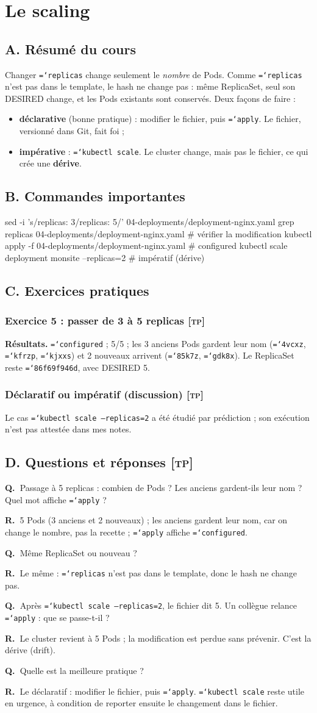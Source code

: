 \documentclass[11pt,a4paper]{article}
\newcommand{\cmd}[1]{\texttt{\hyphenchar\font=`\-#1}}
\newcommand{\tp}{\textsc{[tp]}}
\newcommand{\QR}[2]{\needspace{4\baselineskip}\par\noindent\textbf{Q.~}#1\par\nopagebreak\noindent\textbf{R.~}#2\par\medskip}
\newcommand{\partie}[1]{\needspace{9\baselineskip}\subsection*{#1}}
\newcommand{\exo}[1]{\needspace{8\baselineskip}\subsubsection*{#1}}
\begin{document}
\section{Le scaling}

\partie{A. Résumé du cours}
Changer \cmd{replicas} change seulement le \emph{nombre} de Pods. Comme \cmd{replicas} n'est pas dans le template, le hash ne change pas : même ReplicaSet, seul son DESIRED change, et les Pods existants sont conservés.
Deux façons de faire :
\begin{itemize}
  \item \textbf{déclarative} (bonne pratique) : modifier le fichier, puis \cmd{apply}. Le fichier, versionné dans Git, fait foi ;
  \item \textbf{impérative} : \cmd{kubectl scale}. Le cluster change, mais pas le fichier, ce qui crée une \textbf{dérive}.
\end{itemize}

\partie{B. Commandes importantes}
\begin{code}
sed -i 's/replicas: 3/replicas: 5/' 04-deployments/deployment-nginx.yaml
grep replicas 04-deployments/deployment-nginx.yaml     # vérifier la modification
kubectl apply -f 04-deployments/deployment-nginx.yaml  # configured
kubectl scale deployment monsite --replicas=2          # impératif (dérive)
\end{code}

\partie{C. Exercices pratiques}
\exo{Exercice 5 : passer de 3 à 5 replicas \tp}
\textbf{Résultats.} \cmd{configured} ; 5/5 ; les 3 anciens Pods gardent leur nom (\cmd{4vcxz}, \cmd{kfrzp}, \cmd{kjxxs}) et 2 nouveaux arrivent (\cmd{85k7z}, \cmd{gdk8x}). Le ReplicaSet reste \cmd{86f69f946d}, avec DESIRED 5.

\exo{Déclaratif ou impératif (discussion) \tp}
Le cas \cmd{kubectl scale --replicas=2} a été étudié par prédiction ; son exécution n'est pas attestée dans mes notes.

\partie{D. Questions et réponses \tp}
\QR{Passage à 5 replicas : combien de Pods ? Les anciens gardent-ils leur nom ? Quel mot affiche \cmd{apply} ?}{5 Pods (3 anciens et 2 nouveaux) ; les anciens gardent leur nom, car on change le nombre, pas la recette ; \cmd{apply} affiche \cmd{configured}.}
\QR{Même ReplicaSet ou nouveau ?}{Le même : \cmd{replicas} n'est pas dans le template, donc le hash ne change pas.}
\QR{Après \cmd{kubectl scale --replicas=2}, le fichier dit 5. Un collègue relance \cmd{apply} : que se passe-t-il ?}{Le cluster revient à 5 Pods ; la modification est perdue sans prévenir. C'est la dérive (drift).}
\QR{Quelle est la meilleure pratique ?}{Le déclaratif : modifier le fichier, puis \cmd{apply}. \cmd{kubectl scale} reste utile en urgence, à condition de reporter ensuite le changement dans le fichier.}
\end{document}
